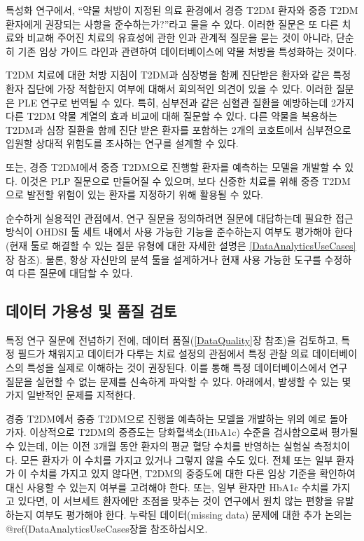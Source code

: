 \documentclass[11pt]{book}
\theoremstyle{definition}
\theoremstyle{definition}
\theoremstyle{definition}
\theoremstyle{remark}
\begin{document}
특성화 연구에서, ``약물 처방이 지정된 의료 환경에서 경증 T2DM 환자와
중증 T2DM 환자에게 권장되는 사항을 준수하는가?''라고 물을 수 있다.
이러한 질문은 또 다른 치료와 비교해 주어진 치료의 유효성에 관한 인과
관계적 질문을 묻는 것이 아니라, 단순히 기존 임상 가이드 라인과 관련하여
데이터베이스에 약물 처방을 특성화하는 것이다.

T2DM 치료에 대한 처방 지침이 T2DM과 심장병을 함께 진단받은 환자와 같은
특정 환자 집단에 가장 적합한지 여부에 대해서 회의적인 의견이 있을 수
있다. 이러한 질문은 PLE 연구로 번역될 수 있다. 특히, 심부전과 같은
심혈관 질환을 예방하는데 2가지 다른 T2DM 약물 계열의 효과 비교에 대해
질문할 수 있다. 다른 약물을 복용하는 T2DM과 심장 질환을 함께 진단 받은
환자를 포함하는 2개의 코호트에서 심부전으로 입원할 상대적 위험도를
조사하는 연구를 설계할 수 있다.

또는, 경증 T2DM에서 중증 T2DM으로 진행할 환자를 예측하는 모델을 개발할
수 있다. 이것은 PLP 질문으로 만들어질 수 있으며, 보다 신중한 치료를 위해
중증 T2DM으로 발전할 위험이 있는 환자를 지정하기 위해 활용될 수 있다.

순수하게 실용적인 관점에서, 연구 질문을 정의하려면 질문에 대답하는데
필요한 접근 방식이 OHDSI 툴 세트 내에서 사용 가능한 기능을 준수하는지
여부도 평가해야 한다(현재 툴로 해결할 수 있는 질문 유형에 대한 자세한
설명은 \ref{DataAnalyticsUseCases}장 참조). 물론, 항상 자신만의 분석
툴을 설계하거나 현재 사용 가능한 도구를 수정하여 다른 질문에 대답할 수
있다.

\subsection{데이터 가용성 및 품질 검토}\label{----}

특정 연구 질문에 전념하기 전에, 데이터 품질(\ref{DataQuality}장 참조)을
검토하고, 특정 필드가 채워지고 데이터가 다루는 치료 설정의 관점에서 특정
관찰 의료 데이터베이스의 특성을 실제로 이해하는 것이 권장된다. 이를 통해
특정 데이터베이스에서 연구 질문을 실현할 수 없는 문제를 신속하게 파악할
수 있다. 아래에서, 발생할 수 있는 몇 가지 일반적인 문제를 지적한다.

경증 T2DM에서 중증 T2DM으로 진행을 예측하는 모델을 개발하는 위의 예로
돌아 가자. 이상적으로 T2DM의 중증도는 당화혈색소(HbA1c) 수준을
검사함으로써 평가될 수 있는데, 이는 이전 3개월 동안 환자의 평균 혈당
수치를 반영하는 실험실 측정치이다. 모든 환자가 이 수치를 가지고 있거나
그렇지 않을 수도 있다. 전체 또는 일부 환자가 이 수치를 가지고 있지
않다면, T2DM의 중증도에 대한 다른 임상 기준을 확인하여 대신 사용할 수
있는지 여부를 고려해야 한다. 또는, 일부 환자만 HbA1c 수치를 가지고
있다면, 이 서브세트 환자에만 초점을 맞추는 것이 연구에서 원치 않는
편향을 유발하는지 여부도 평가해야 한다. 누락된 데이터(missing data)
문제에 대한 추가 논의는 @ref(DataAnalyticsUseCases장을 참조하십시오.
\end{document}

